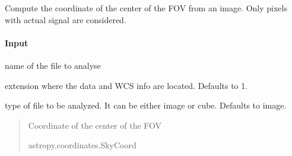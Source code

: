 \documentclass[letterpaper,10pt,english]{sphinxmanual}
\begin{document}

\begin{fulllineitems}
\label{\detokenize{api/pymusepipe:pymusepipe.util_image.get_centre_from_image_or_cube}}
\pysigstartsignatures
{}
\pysigstopsignatures
\sphinxAtStartPar
Compute the coordinate of the center of the FOV from an image. Only pixels with
actual signal are considered.


\paragraph{Input}
\label{\detokenize{api/pymusepipe:id146}}\begin{description}
\sphinxAtStartPar
name of the file to analyse

\sphinxAtStartPar
extension where the data and WCS info are located. Defaults to 1.

\sphinxAtStartPar
type of file to be analyzed. It can be either image or cube. Defaults to image.

\end{description}
\begin{quote}\begin{description}
\sphinxAtStartPar
{} \textendash{} Coordinate of the center of the FOV

\sphinxAtStartPar
astropy.coordinates.SkyCoord

\end{description}\end{quote}

\end{fulllineitems}

\end{document}
